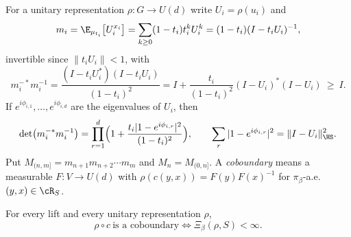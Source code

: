 For a unitary representation $\rho:G\to U(d)$ write $U_i=\rho(u_i)$ and
\begin{equation}\label{XXVII:eq:mean}
m_i=\E_{\mu_{t_i}}\bigl[U_i^{x_i}\bigr]=\sum_{k\ge0}(1-t_i)t_i^kU_i^k=(1-t_i)(I-t_iU_i)^{-1},
\end{equation}
invertible since $\|t_iU_i\|<1$, with
\begin{equation}\label{XXVII:eq:minv}
m_i^{-*}m_i^{-1}=\frac{(I-t_iU_i^*)(I-t_iU_i)}{(1-t_i)^2}=I+\frac{t_i}{(1-t_i)^2}(I-U_i)^*(I-U_i)\ \ge\ I .
\end{equation}
If $e^{i\phi_{i,1}},\dots,e^{i\phi_{i,d}}$ are the eigenvalues of $U_i$, then
\begin{equation}\label{XXVII:eq:det}
\det\bigl(m_i^{-*}m_i^{-1}\bigr)=\prod_{r=1}^d\Bigl(1+\frac{t_i|1-e^{i\phi_{i,r}}|^2}{(1-t_i)^2}\Bigr),
\qquad
\sum_r|1-e^{i\phi_{i,r}}|^2=\|I-U_i\|_{\HS}^2 .
\end{equation}
Put $M_{(n,m]}=m_{n+1}m_{n+2}\cdots m_m$ and $M_n=M_{(0,n]}$. A \emph{coboundary} means a
measurable $F:V\to U(d)$ with $\rho(c(y,x))=F(y)F(x)^{-1}$ for $\pi_\beta$-a.e.\ $(y,x)\in\cR_S$.

\begin{theorem}\label{XXVII:thm:kakutani}
For every lift and every unitary representation $\rho$,
\[
\rho\circ c\ \text{is a coboundary}\iff\Xi_\beta(\rho,S)<\infty .
\]
\end{theorem}

